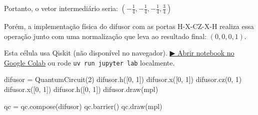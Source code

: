 \documentclass[
  brazilian,
]{report}
\newenvironment{Shaded}{\begin{snugshade}}{\end{snugshade}}
\newcommand{\DecValTok}[1]{\textcolor[rgb]{0.68,0.00,0.00}{#1}}
\newcommand{\NormalTok}[1]{\textcolor[rgb]{0.00,0.23,0.31}{#1}}
\newcommand{\OperatorTok}[1]{\textcolor[rgb]{0.37,0.37,0.37}{#1}}
\newcommand{\StringTok}[1]{\textcolor[rgb]{0.13,0.47,0.30}{#1}}
\begin{document}
Portanto, o vetor intermediário seria:
\((-\frac{1}{4}, -\frac{1}{4}, -\frac{1}{4}, \frac{3}{4})\)

Porém, a implementação física do difusor com as portas H-X-CZ-X-H
realiza essa operação junto com uma normalização que leva ao resultado
final: \((0, 0, 0, 1)\).

\begin{tcolorbox}[enhanced jigsaw, arc=.35mm, bottomrule=.15mm, bottomtitle=1mm, breakable, colback=white, colbacktitle=quarto-callout-warning-color!10!white, colframe=quarto-callout-warning-color-frame, coltitle=black, left=2mm, leftrule=.75mm, opacityback=0, opacitybacktitle=0.6, rightrule=.15mm, title=\textcolor{quarto-callout-warning-color}{\faExclamationTriangle}\hspace{0.5em}{⚛️ Célula Qiskit --- execute no Colab ou localmente}, titlerule=0mm, toprule=.15mm, toptitle=1mm]

Esta célula usa Qiskit (não disponível no navegador).
\href{https://colab.research.google.com/github/maxwellamaral/aula-quantum/blob/main/notebooks/06-grover.ipynb}{▶
Abrir notebook no Google Colab} ou rode \texttt{uv\ run\ jupyter\ lab}
localmente.

\begin{Shaded}
\begin{Highlighting}[]

\NormalTok{difusor }\OperatorTok{=}\NormalTok{ QuantumCircuit(}\DecValTok{2}\NormalTok{)}
\NormalTok{difusor.h([}\DecValTok{0}\NormalTok{, }\DecValTok{1}\NormalTok{])}
\NormalTok{difusor.x([}\DecValTok{0}\NormalTok{, }\DecValTok{1}\NormalTok{])}
\NormalTok{difusor.cz(}\DecValTok{0}\NormalTok{, }\DecValTok{1}\NormalTok{)}
\NormalTok{difusor.x([}\DecValTok{0}\NormalTok{, }\DecValTok{1}\NormalTok{])}
\NormalTok{difusor.h([}\DecValTok{0}\NormalTok{, }\DecValTok{1}\NormalTok{])}
\NormalTok{difusor.draw(}\StringTok{\textquotesingle{}mpl\textquotesingle{}}\NormalTok{)}
\end{Highlighting}
\end{Shaded}

\end{tcolorbox}

\begin{Shaded}
\begin{Highlighting}[]

\NormalTok{qc = qc.compose(difusor)}
\NormalTok{qc.barrier()}
\NormalTok{qc.draw(\textquotesingle{}mpl\textquotesingle{})}
\end{Highlighting}
\end{Shaded}
\end{document}
